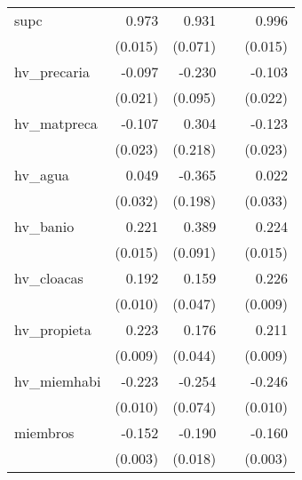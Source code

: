 {\begin{longtable}{l*{4}{D{.}{.}{-1}}}
\addlinespace
supc        &       0.973\sym{***}&       0.931\sym{***}&                     &       0.996\sym{***}\\
            &     (0.015)         &     (0.071)         &                     &     (0.015)         \\
\addlinespace
hv\_precaria &      -0.097\sym{***}&      -0.230\sym{*}  &                     &      -0.103\sym{***}\\
            &     (0.021)         &     (0.095)         &                     &     (0.022)         \\
\addlinespace
hv\_matpreca &      -0.107\sym{***}&       0.304         &                     &      -0.123\sym{***}\\
            &     (0.023)         &     (0.218)         &                     &     (0.023)         \\
\addlinespace
hv\_agua     &       0.049         &      -0.365         &                     &       0.022         \\
            &     (0.032)         &     (0.198)         &                     &     (0.033)         \\
\addlinespace
hv\_banio    &       0.221\sym{***}&       0.389\sym{***}&                     &       0.224\sym{***}\\
            &     (0.015)         &     (0.091)         &                     &     (0.015)         \\
\addlinespace
hv\_cloacas  &       0.192\sym{***}&       0.159\sym{***}&                     &       0.226\sym{***}\\
            &     (0.010)         &     (0.047)         &                     &     (0.009)         \\
\addlinespace
hv\_propieta &       0.223\sym{***}&       0.176\sym{***}&                     &       0.211\sym{***}\\
            &     (0.009)         &     (0.044)         &                     &     (0.009)         \\
\addlinespace
hv\_miemhabi &      -0.223\sym{***}&      -0.254\sym{***}&                     &      -0.246\sym{***}\\
            &     (0.010)         &     (0.074)         &                     &     (0.010)         \\
\addlinespace
miembros    &      -0.152\sym{***}&      -0.190\sym{***}&                     &      -0.160\sym{***}\\
            &     (0.003)         &     (0.018)         &                     &     (0.003)         \\

\end{longtable}}
